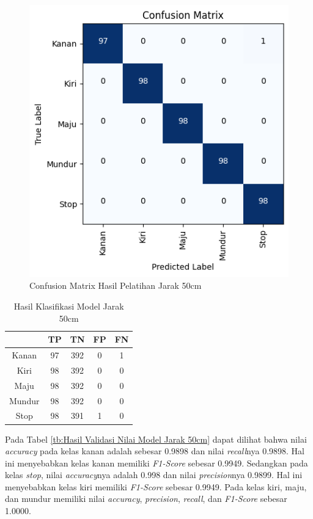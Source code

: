 \begin{figure} [H] \centering
  \includegraphics[scale=0.8]{gambar/50confusion.png}
  \caption{Confusion Matrix Hasil Pelatihan Jarak 50cm}
  \label{fig:ConfusionMatrixHasilPelatihanJarak50cm}
\end{figure}


\begin{table}[H]
  \centering
  \caption{Hasil Klasifikasi Model Jarak 50cm}
  \label{tb:Hasil Klasifikasi Jarak 50cm}
\begin{tabular}{|c|c|c|c|c|}
  \hline
  \rowcolor[HTML]{C0C0C0} 
  \cellcolor[HTML]{C0C0C0} & TP & TN  & FP & FN \\ \hline
  Kanan                    & 97 & 392 & 0  & 1  \\ \hline
  Kiri                     & 98 & 392 & 0  & 0  \\ \hline
  Maju                     & 98 & 392 & 0  & 0  \\ \hline
  Mundur                   & 98 & 392 & 0  & 0  \\ \hline
  Stop                     & 98 & 391 & 1  & 0  \\ \hline
  \end{tabular}
  \end{table}

Pada Tabel \ref{tb:Hasil Validasi Nilai Model Jarak 50cm} dapat dilihat bahwa nilai \emph{accuracy} pada kelas kanan adalah sebesar 0.9898 dan nilai \emph{recall}nya 0.9898. Hal ini menyebabkan kelas kanan memiliki \emph{F1-Score} sebesar 0.9949. Sedangkan pada kelas \emph{stop}, nilai \emph{accuracy}nya adalah 0.998 dan nilai \emph{precision}nya 0.9899. Hal ini menyebabkan kelas kiri memiliki \emph{F1-Score} sebesar 0.9949. Pada kelas kiri, maju, dan mundur memiliki nilai \emph{accuracy}, \emph{precision}, \emph{recall}, dan \emph{F1-Score} sebesar 1.0000.

